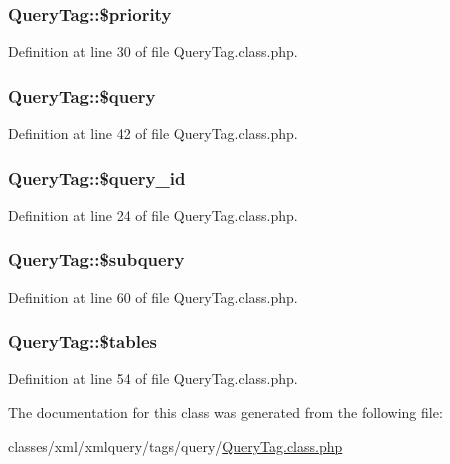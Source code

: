 \hypertarget{classQueryTag_ac09e6c0124ba1d5945c7f93232e13827}{
\subsubsection[{\$priority}]{\setlength{\rightskip}{0pt plus 5cm}Query\-Tag\-::\$priority}}\label{classQueryTag_ac09e6c0124ba1d5945c7f93232e13827}


Definition at line 30 of file Query\-Tag.\-class.\-php.

\hypertarget{classQueryTag_a40fbf27ebaa31f5430080152164c3bae}{
\subsubsection[{\$query}]{\setlength{\rightskip}{0pt plus 5cm}Query\-Tag\-::\$query}}\label{classQueryTag_a40fbf27ebaa31f5430080152164c3bae}


Definition at line 42 of file Query\-Tag.\-class.\-php.

\hypertarget{classQueryTag_ac9ddaab237f51a26128e5f4d2869a430}{
\subsubsection[{\$query\-\_\-id}]{\setlength{\rightskip}{0pt plus 5cm}Query\-Tag\-::\$query\-\_\-id}}\label{classQueryTag_ac9ddaab237f51a26128e5f4d2869a430}


Definition at line 24 of file Query\-Tag.\-class.\-php.

\hypertarget{classQueryTag_a1fb40050f2484c2daa9e77cf53d11c15}{
\subsubsection[{\$subquery}]{\setlength{\rightskip}{0pt plus 5cm}Query\-Tag\-::\$subquery}}\label{classQueryTag_a1fb40050f2484c2daa9e77cf53d11c15}


Definition at line 60 of file Query\-Tag.\-class.\-php.

\hypertarget{classQueryTag_aed79c0c40d39fe9042ade3b23b6e172e}{
\subsubsection[{\$tables}]{\setlength{\rightskip}{0pt plus 5cm}Query\-Tag\-::\$tables}}\label{classQueryTag_aed79c0c40d39fe9042ade3b23b6e172e}


Definition at line 54 of file Query\-Tag.\-class.\-php.



The documentation for this class was generated from the following file\-:\begin{DoxyCompactItemize}
\item 
classes/xml/xmlquery/tags/query/\hyperlink{QueryTag_8class_8php}{Query\-Tag.\-class.\-php}\end{DoxyCompactItemize}
